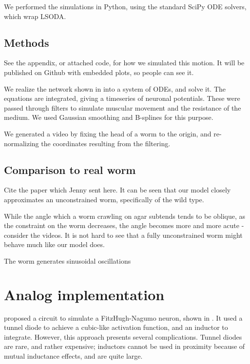 \documentclass[
    11pt,
]{article}
\begin{document}
We performed the simulations in Python, using the standard SciPy ODE solvers, which wrap LSODA. %

\subsection{Methods}

See the appendix, or attached code, for how we simulated this motion.  It will be published on Github with embedded plots, so people can see it.

We realize the network shown in  into a system of ODEs, and solve it.  The equations are integrated, giving a timeseries of neuronal potentials.  These were passed through filters to simulate muscular movement and the resistance of the medium.  We used Gaussian smoothing and B-splines for this purpose.

We generated a video by fixing the head of a worm to the origin, and re-normalizing the coordinates resulting from the filtering.

\subsection{Comparison to real worm}

Cite the paper which Jenny sent here.  It can be seen that our model closely approximates an unconstrained worm, specifically of the wild type.

While the angle which a worm crawling on agar subtends tends to be oblique, as the constraint on the worm decreases, the angle becomes more and more acute - consider the videos.  It is not hard to see that a fully unconstrained worm might behave much like our model does.

The worm generates sinusoidal oscillations


\section{Analog implementation}

\citet{nagumo1962} proposed a circuit to simulate a FitzHugh-Nagumo neuron, shown in .  It used a tunnel diode to achieve a cubic-like activation function, and an inductor to integrate.  However, this approach presents several complications.  Tunnel diodes are rare, and rather expensive; inductors cannot be used in proximity because of mutual inductance effects, and are quite large.
\end{document}
